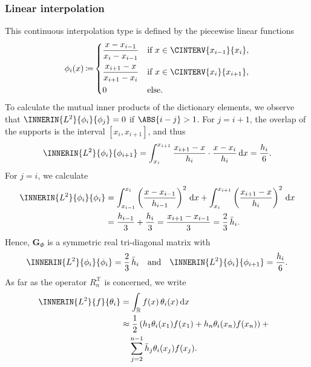 \documentclass[a4paper]{paper}
\newcommand*{\SPC}[1]{{\ensuremath{\mathscr{#1}}}}
\newcommand{\RR}{{\ensuremath{\mathbb{R}}}}
\newcommand*{\REST}[2]{\ensuremath{R_{#1}^{#2}}}
\newcommand*{\RnX}{{\ensuremath{\REST{n}{\SPC{X}}}}}
\DeclareMathOperator{\DEFEQ}{{\coloneqq}}
\newcommand*{\D}{{\ensuremath{\mathrm{d}}}}
\newcommand*{\BDG}{\boldsymbol{G}}
\begin{document}
\subsubsection{Linear interpolation}
\label{subsubsec:specif:interp:linear}

This continuous interpolation type is defined by the piecewise linear functions 
%
\begin{equation*}
 \phi_i(x) \DEFEQ
 \begin{dcases}
  \frac{x - x_{i-1}}{x_i - x_{i-1}} & \text{if } x \in \CINTERV{x_{i-1}}{x_i}, \\
  \frac{x_{i+1} - x}{x_{i+1} - x_i} & \text{if } x \in \CINTERV{x_i}{x_{i+1}}, \\
  0 & \text{else}.
 \end{dcases}
\end{equation*}
%
To calculate the mutual inner products of the dictionary elements, we observe that 
$\INNERIN{L^2}{\phi_i}{\phi_j} = 0$ if $\ABS{i-j} > 1$. For $j=i+1$, the overlap of the supports is the 
interval ${[x_i, x_{i+1}]}$, and thus
%
\begin{equation*}
 \INNERIN{L^2}{\phi_i}{\phi_{i+1}}
 = \int_{x_i}^{x_{i+1}} \frac{x_{i+1} - x}{h_i} \cdot \frac{x - x_i}{h_i}\, \D x
 = \frac{h_i}{6}.
\end{equation*}
%
For $j=i$, we calculate
%
\begin{align*}
 \INNERIN{L^2}{\phi_i}{\phi_i}
 &= \int_{x_{i-1}}^{x_i} \left( \frac{x - x_{i-1}}{h_{i-1}} \right)^2\, \D x +
 \int_{x_i}^{x_{i+1}} \left( \frac{x_{i+1} - x}{h_i} \right)^2\, \D x \\
 &= \frac{h_{i-1}}{3} + \frac{h_i}{3} 
 = \frac{x_{i+1} - x_{i-1}}{3}
 = \frac{2}{3}\, \bar h_i.
\end{align*}
%
Hence, $\BDG_\Phi$ is a symmetric real tri-diagonal matrix with
%
\begin{equation*}
 \INNERIN{L^2}{\phi_i}{\phi_i} = \frac{2}{3}\, \bar h_i
 \quad \text{and} \quad
 \INNERIN{L^2}{\phi_i}{\phi_{i+1}} = \frac{h_i}{6}.
\end{equation*}
%
As far as the operator $\RnX$ is concerned, we write
%
\begin{align*}
 \INNERIN{L^2}{f}{\theta_i}
 &= \int_\RR f(x)\, \theta_i(x)\, \D x \\
 & \approx \frac{1}{2}\left(
 h_1 \theta_i(x_1) f(x_1) + h_n \theta_i(x_n) f(x_n)  
 \right) + \phantom{x} \\
 &\hspace{10pt} \sum_{j=2}^{n-1} \bar h_j \theta_i(x_j) f(x_j).
\end{align*}
\end{document}
